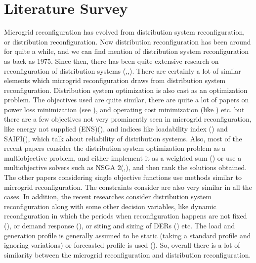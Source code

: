 \chapter{Literature Survey} \label{ch2}

Microgrid reconfiguration has evolved from distribution system reconfiguration, or distribution reconfiguration. Now distribution reconfiguration has been around for quite a while, and we can find mention of distribution system reconfiguration as back as 1975\citep{Merl1975}.
Since then, there has been quite extensive research on reconfiguration of distribution systems (\citep{mgrrev01},\citep{mgrrev02},\citep{mgrrev03}). There are certainly a lot of similar elements which microgrid reconfiguration draws from distribution system reconfiguration. Distribution system optimization is also cast as an optimization problem. The objectives used are quite similar, there are quite a lot of papers on power loss minimization (see \citep{mgrrev01}), and operating cost minimization (like \citep{mgrj20}) etc. but there are a few objectives not very prominently seen in microgrid reconfiguration, like energy not supplied (ENS)(\citep{mgrj25}), and indices like loadability index (\citep{mgrj27}) and SAIFI(\citep{mgrj25}), which talk about reliability of distribution systems. Also, most of the recent papers consider the distribution system optimization problem as a multiobjective problem, and either implement it as a weighted sum (\citep{mgrj25}) or use a multiobjective solvers such as NSGA 2(\citep{mgrj27},\citep{mgrj61}), and then rank the solutions obtained. The other papers considering single objective functions use methods similar to microgrid reconfiguration. The constraints consider are also very similar in all the cases. In addition, the recent researches consider distribution system reconfiguration along with some other decision variables, like dynamic reconfiguration in which the periods when reconfiguration happens are not fixed (\citep{mgrj20}), or demand response (\citep{mgrj28}), or siting and sizing of DERs (\citep{mgrj43}) etc. The load and generation profile is generally assumed to be static (taking a standard profile and ignoring variations) or forecasted profile is used (\citep{mgrj20}). So, overall there is a lot of similarity between the microgrid reconfiguration and distribution reconfiguration.\\
